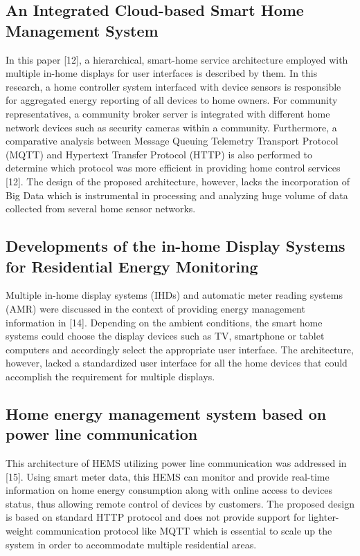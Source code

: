 \documentclass[a4paper,12pt,oneside]{article}
\begin{document}
\subsection{An Integrated Cloud-based Smart Home Management System}
In this paper [12], a hierarchical, smart-home service architecture employed with
multiple in-home displays for user interfaces is described by them.
In this research, a home controller system interfaced
with device sensors is responsible for aggregated energy
reporting of all devices to home owners. For community
representatives, a community broker server is integrated with
different home network devices such as security cameras
within a community. Furthermore, a comparative analysis
between Message Queuing Telemetry Transport Protocol
(MQTT) and Hypertext Transfer Protocol (HTTP) is also
performed to determine which protocol was more efficient in
providing home control services [12]. The design of the
proposed architecture, however, lacks the incorporation of Big
Data which is instrumental in processing and analyzing huge
volume of data collected from several home sensor networks.

\newpage
\subsection{Developments of the in-home Display Systems for Residential Energy Monitoring}
Multiple in-home display systems (IHDs) and automatic
meter reading systems (AMR) were discussed in the context of
providing energy management information in [14]. Depending
on the ambient conditions, the smart home systems could
choose the display devices such as TV, smartphone or tablet
computers and accordingly select the appropriate user
interface. The architecture, however, lacked a standardized
user interface for all the home devices that could accomplish
the requirement for multiple displays.

\subsection{Home energy management system based on power line communication}
This architecture of HEMS utilizing power line communication was addressed
in [15]. Using smart meter data, this HEMS can monitor and provide real-time information on home energy consumption
along with online access to devices status, thus allowing
remote control of devices by customers. The proposed design
is based on standard HTTP protocol and does not provide
support for lighter-weight communication protocol like
MQTT which is essential to scale up the system in order to
accommodate multiple residential areas.
\end{document}

